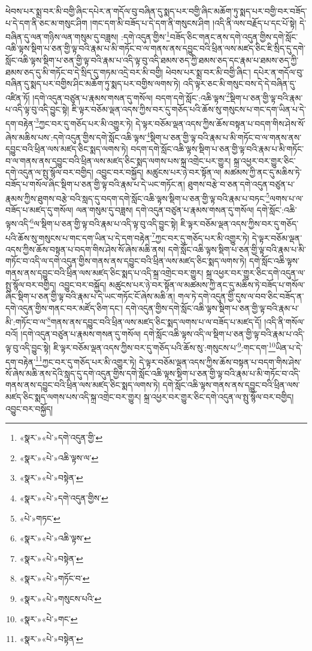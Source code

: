 ཕེབས་པར་སྨྲ་བར་མི་བགྱི་ཞིང་དཔེར་ན་གདོལ་བུ་བཞིན་དུ་སྨད་པར་བགྱི་ཞིང་མཆོག་ཏུ་སྨད་པར་བགྱི་བར་བཟོད་པ་དེ་དག་ནི་ཅང་མ་གསུང་ཤིག །གང་དག་མི་བཟོད་པ་དེ་དག་ནི་གསུངས་ཤིག །འདི་ནི་ལས་བརྗོད་པ་དང་པོ་སྟེ། དེ་བཞིན་དུ་ལན་གཉིས་ལན་གསུམ་དུ་བཟླས། :དགེ་འདུན་གྱིས་\footnote{«སྣར་»«པེ་»དགེ་འདུན་གྱི་}བཟོད་ཅིང་གནང་ནས་དགེ་འདུན་གྱིས་དགེ་སློང་འཆི་ལྟས་སྡིག་པ་ཅན་གྱི་ལྟ་བའི་རྣམ་པ་མི་གཏོང་བ་ལ་གནས་ནས་དབྱུང་བའི་ཕྲིན་ལས་མཛད་ཅིང་ཇི་སྲིད་དུ་དགེ་སློང་འཆི་ལྟས་སྡིག་པ་ཅན་གྱི་ལྟ་བའི་རྣམ་པ་འདི་ལྟ་བུ་འདི་ཐམས་ཅད་ཀྱི་ཐམས་ཅད་དང་རྣམ་པ་ཐམས་ཅད་ཀྱི་ཐམས་ཅད་དུ་མི་གཏོང་བ་དེ་སྲིད་དུ་གཏམ་འདྲེ་བར་མི་བགྱི། ཕེབས་པར་སྨྲ་བར་མི་བགྱི་ཞིང་། དཔེར་ན་གདོལ་བུ་བཞིན་དུ་སྨད་པར་བགྱིས་ཤིང་མཆོག་ཏུ་སྨད་པར་བགྱིས་ལགས་ཏེ། འདི་ལྟར་ཅང་མི་གསུང་བས་དེ་དེ་བཞིན་དུ་འཛིན་ཏོ། །དགེ་འདུན་བཙུན་པ་རྣམས་གསན་དུ་གསོལ། བདག་དགེ་སློང་:འཆི་ལྟས་\footnote{«སྣར་»«པེ་»འཆི་ལྟས་ལ་}སྡིག་པ་ཅན་གྱི་ལྟ་བའི་རྣམ་པ་འདི་ལྟ་བུ་འདི་བྱུང་སྟེ། ཇི་ལྟར་བཅོམ་ལྡན་འདས་ཀྱིས་བར་དུ་གཅོད་པའི་ཆོས་སུ་གསུངས་པ་གང་དག་ཡིན་པ་དེ་དག་བརྟེན་\footnote{«སྣར་»«པེ་»བསྟེན་}ཀྱང་བར་དུ་གཅོད་པར་མི་འགྱུར་ཏེ། དེ་ལྟར་བཅོམ་ལྡན་འདས་ཀྱིས་ཆོས་བསྟན་པ་བདག་གིས་ཤེས་སོ་ཞེས་མཆིས་པས་:དགེ་འདུན་གྱིས་དགེ་སློང་འཆི་ལྟས་\footnote{«སྣར་»«པེ་»དགེ་འདུན་གྱིས་}སྡིག་པ་ཅན་གྱི་ལྟ་བའི་རྣམ་པ་མི་གཏོང་བ་ལ་གནས་ནས་དབྱུང་བའི་ཕྲིན་ལས་མཛད་ཅིང་སྨད་ལགས་ཏེ། བདག་དགེ་སློང་འཆི་ལྟས་སྡིག་པ་ཅན་གྱི་ལྟ་བའི་རྣམ་པ་མི་གཏོང་བ་ལ་གནས་ནས་དབྱུང་བའི་ཕྲིན་ལས་མཛད་ཅིང་སྨད་ལགས་པས་སྐྲ་འགྲེང་པར་གྱུར། སྐྲ་འཕྱར་བར་གྱུར་ཅིང་དགེ་འདུན་ལ་སྤུ་སྙོལ་བར་བགྱིད། འབྱུང་བར་བསྐྱོད། མཚུངས་པར་ཉེ་བར་སྟོན་ལ། མཚམས་ཀྱི་ནང་དུ་མཆིས་ཏེ་བཟོད་པ་གསོལ་ཞིང་སྡིག་པ་ཅན་གྱི་ལྟ་བའི་རྣམ་པ་དེ་ཡང་གཏོང་ན། ཐུགས་བརྩེ་བ་ཅན་དགེ་འདུན་བཙུན་པ་རྣམས་ཀྱིས་ཐུགས་བརྩེ་བའི་སླད་དུ་བདག་དགེ་སློང་འཆི་ལྟས་སྡིག་པ་ཅན་གྱི་ལྟ་བའི་རྣམ་པ་བཏང་\footnote{«པེ་»གཏང་}ལགས་པ་ལ་བཟོད་པ་མཛད་དུ་གསོལ། ལན་གསུམ་དུ་བཟླས། དགེ་འདུན་བཙུན་པ་རྣམས་གསན་དུ་གསོལ། དགེ་སློང་:འཆི་ལྟས་འདི་\footnote{«སྣར་»«པེ་»འཆི་ལྟས་}ལ་སྡིག་པ་ཅན་གྱི་ལྟ་བའི་རྣམ་པ་འདི་ལྟ་བུ་འདི་བྱུང་སྟེ། ཇི་ལྟར་བཅོམ་ལྡན་འདས་ཀྱིས་བར་དུ་གཅོད་པའི་ཆོས་སུ་གསུངས་པ་གང་དག་ཡིན་པ་དེ་དག་བརྟེན་\footnote{«སྣར་»«པེ་»བསྟེན་}ཀྱང་བར་དུ་གཅོད་པར་མི་འགྱུར་ཏེ། དེ་ལྟར་བཅོམ་ལྡན་འདས་ཀྱིས་ཆོས་བསྟན་པ་བདག་གིས་ཤེས་སོ་ཞེས་མཆི་ནས། དགེ་སློང་འཆི་ལྟས་སྡིག་པ་ཅན་གྱི་ལྟ་བའི་རྣམ་པ་མི་གཏོང་བ་འདི་ལ་དགེ་འདུན་གྱིས་གནས་ནས་དབྱུང་བའི་ཕྲིན་ལས་མཛད་ཅིང་སྨད་ལགས་ཏེ། དགེ་སློང་འཆི་ལྟས་གནས་ནས་དབྱུང་བའི་ཕྲིན་ལས་མཛད་ཅིང་སྨད་པ་འདི་སྐྲ་འགྲེང་བར་གྱུར། སྐྲ་འཕྱར་བར་གྱུར་ཅིང་དགེ་འདུན་ལ་སྤུ་སྙོལ་བར་བགྱིད། འབྱུང་བར་བསྐྱོད། མཚུངས་པར་ཉེ་བར་སྟོན་ལ་མཚམས་ཀྱི་ནང་དུ་མཆིས་ཏེ་བཟོད་པ་གསོལ་ཞིང་སྡིག་པ་ཅན་གྱི་ལྟ་བའི་རྣམ་པ་དེ་ཡང་གཏོང་ངོ་ཞེས་མཆི་ན། གལ་ཏེ་དགེ་འདུན་གྱི་དུས་ལ་བབ་ཅིང་བཟོད་ན་དགེ་འདུན་གྱིས་གནང་བར་མཛོད་ཅིག་དང་། དགེ་འདུན་གྱིས་དགེ་སློང་འཆི་ལྟས་སྡིག་པ་ཅན་གྱི་ལྟ་བའི་རྣམ་པ་མི་:གཏོང་བ་ལ་\footnote{«སྣར་»«པེ་»གཏོང་བ་}གནས་ནས་དབྱུང་བའི་ཕྲིན་ལས་མཛད་ཅིང་སྨད་ལགས་པ་ལ་བཟོད་པ་མཛད་དོ། །འདི་ནི་གསོལ་བའོ། །དགེ་འདུན་བཙུན་པ་རྣམས་གསན་དུ་གསོལ། དགེ་སློང་འཆི་ལྟས་འདི་ལ་སྡིག་པ་ཅན་གྱི་ལྟ་བའི་རྣམ་པ་འདི་ལྟ་བུ་འདི་བྱུང་སྟེ། ཇི་ལྟར་བཅོམ་ལྡན་འདས་ཀྱིས་བར་དུ་གཅོད་པའི་ཆོས་སུ་:གསུངས་པ་\footnote{«སྣར་»«པེ་»གསུངས་པའི་}:གང་དག་\footnote{«སྣར་»«པེ་»གང་}ཡིན་པ་དེ་དག་བརྟེན་\footnote{«སྣར་»«པེ་»བསྟེན་}ཀྱང་བར་དུ་གཅོད་པར་མི་འགྱུར་ཏེ། དེ་ལྟར་བཅོམ་ལྡན་འདས་ཀྱིས་ཆོས་བསྟན་པ་བདག་གིས་ཤེས་སོ་ཞེས་མཆི་ནས་དེའི་སླད་དུ་དགེ་འདུན་གྱིས་དགེ་སློང་འཆི་ལྟས་སྡིག་པ་ཅན་གྱི་ལྟ་བའི་རྣམ་པ་མི་གཏོང་བ་འདི་གནས་ནས་དབྱུང་བའི་ཕྲིན་ལས་མཛད་ཅིང་སྨད་ལགས་ཏེ། དགེ་སློང་འཆི་ལྟས་གནས་ནས་དབྱུང་བའི་ཕྲིན་ལས་མཛད་ཅིང་སྨད་ལགས་པས་འདི་སྐྲ་འགྲེང་བར་གྱུར། སྐྲ་འཕྱར་བར་གྱུར་ཅིང་དགེ་འདུན་ལ་སྤུ་སྙོལ་བར་བགྱིད། འབྱུང་བར་བསྐྱོད། 